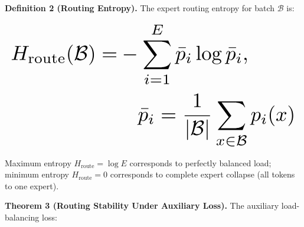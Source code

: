 \documentclass[10pt,journal,compsoc,twocolumn]{IEEEtran}
\begin{document}
\textbf{Definition 2 (Routing Entropy).} The expert routing entropy for batch $\mathcal{B}$ is:

























\begin{equation}
\resizebox{\columnwidth}{!}{$\displaystyle
\begin{aligned}
H_{\text{route}}(\mathcal{B}) = & -\sum_{i=1}^E \bar{p}_i \log \bar{p}_i, \\
& \quad \bar{p}_i = \frac{1}{|\mathcal{B}|}\sum_{x \in \mathcal{B}} p_i(x)
\end{aligned}
$}
\end{equation}

























Maximum entropy $H_{\text{route}} = \log E$ corresponds to perfectly balanced load; minimum entropy $H_{\text{route}} = 0$ corresponds to complete expert collapse (all tokens to one expert).

\textbf{Theorem 3 (Routing Stability Under Auxiliary Loss).} The auxiliary load-balancing loss:
\end{document}
